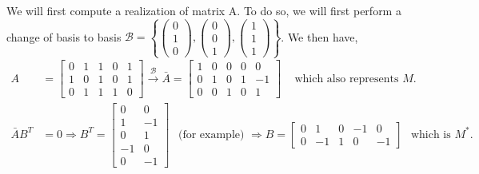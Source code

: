 \documentclass[a4paper, 10pt]{article}
\theoremstyle{definition} %
\begin{document}
We will first compute a realization of matrix A.
To do so, we will first perform a change of basis to basis $\mathcal{B} = \left\lbrace \left( \begin{array}{c} 0 \\ 1 \\ 0 \end{array} \right), \left( \begin{array}{c} 0 \\ 0 \\ 1 \end{array} \right), \left( \begin{array}{c} 1 \\ 1 \\ 1 \end{array} \right) \right\rbrace$. We then have,
\begin{equation*}
    \begin{split}
        A & = \left[
            \begin{array}{ccccc}
                0 & 1 & 1 & 0 & 1 \\
                1 & 0 & 1 & 0 & 1 \\
                0 & 1 & 1 & 1 & 0
            \end{array}
        \right]
        \overset{\mathcal{B}}{\longrightarrow}
        \bar{A} = \left[
            \begin{array}{ccccc}
                1 & 0 & 0 & 0 & 0 \\
                0 & 1 & 0 & 1 & -1 \\
                0 & 0 & 1 & 0 & 1
            \end{array}
        \right]
        \hspace{10pt} \text{ which also represents $M$.} \\[10pt]
        \bar{A}B^T & = 0 \Longrightarrow 
        B^T = \left[
            \begin{array}{cc}
                0 & 0  \\
                1  & -1 \\
                0  & 1 \\
                -1 & 0 \\
                0 & -1
            \end{array}
        \right] \hspace{5pt} \text{ (for example) } \Longrightarrow
        B = \left[
            \begin{array}{ccccc}
                0 & 1 & 0 & -1 & 0 \\
                0 & -1 & 1 & 0 & -1
            \end{array} 
        \right] \hspace{5pt} \text{ which is $M^*$.}
    \end{split}
\end{equation*}
\end{document}
